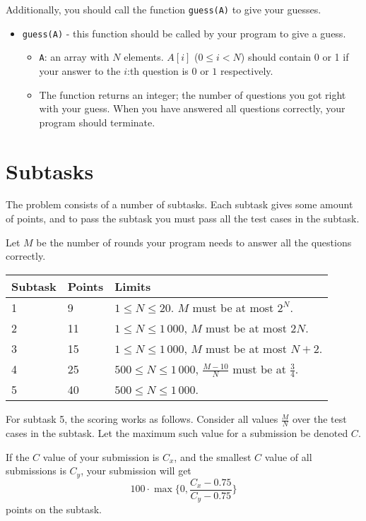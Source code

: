 Additionally, you should call the function \texttt{guess(A)} to give your guesses.
\begin{itemize}
  \item \texttt{guess(A)} - this function should be called by your program to give a guess.
    \begin{itemize}
      \item \texttt{A}: an array with $N$ elements. $A[i]$ ($0 \le i < N$) should contain 0 or 1 if your answer to the $i$:th question is $0$ or $1$ respectively.
      \item The function returns an integer; the number of questions you got right with your guess. When you have answered all questions correctly, your program should terminate.
    \end{itemize}
\end{itemize}


\section*{Subtasks}
The problem consists of a number of subtasks. Each subtask gives some amount of points, and to pass
the subtask you must pass all the test cases in the subtask.

Let $M$ be the number of rounds your program needs to answer all the questions correctly.

\begin{tabular}{|l|l|l|}
  \hline
  \textbf{Subtask} & \textbf{Points} & \textbf{Limits} \\ \hline
  1 & 9 & $1 \le N \le 20$. $M$ must be at most $2^N$.  \\ \hline
  2 & 11 & $1 \le N \le 1\,000$, $M$ must be at most $2N$. \\ \hline
  3 & 15 & $1 \le N \le 1\,000$, $M$ must be at most $N + 2$. \\ \hline
  4 & 25 & $500 \le N \le 1\,000$, $\frac{M - 10}{N}$ must be at $\frac{3}{4}$. \\ \hline
  5 & 40 & $500 \le N \le 1\,000$. \\ \hline
\end{tabular}

For subtask 5, the scoring works as follows. Consider all values $\frac{M}{N}$ over the test cases in the subtask.
Let the maximum such value for a submission be denoted $C$.

If the $C$ value of your submission is $C_x$, and the smallest $C$ value of all submissions is $C_y$, your submission will get
\[ 100 \cdot \max \{ 0, \frac{C_x - 0.75}{C_y - 0.75} \} \]
points on the subtask.

